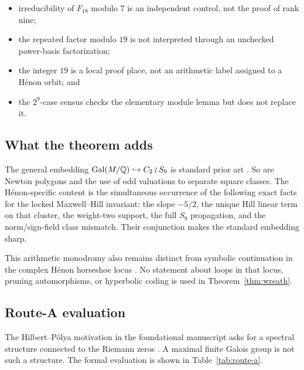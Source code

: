 \begin{itemize}[leftmargin=*,itemsep=2pt]
\item irreducibility of \(F_{18}\) modulo \(7\) is an independent control,
      not the proof of rank nine;
\item the repeated factor modulo \(19\) is not interpreted through an
      unchecked power-basis factorization;
\item the integer \(19\) is a local proof place, not an arithmetic label
      assigned to a H\'enon orbit; and
\item the \(2^9\)-case census checks the elementary module lemma but does
      not replace it.
\end{itemize}

\subsection{What the theorem adds}

The general embedding
\(\operatorname{Gal}(M/\mathbb{Q})\hookrightarrow C_2\mathbin{\wr} S_9\) is standard prior art
\citep{barquero2023wreath}.  So are Newton polygons and the use of odd
valuations to separate square classes.  The H\'enon-specific content is the
simultaneous occurrence of the following exact facts for the locked
Maxwell--Hill invariant: the slope \(-5/2\), the unique Hill linear term on
that cluster, the weight-two support, the full \(S_9\) propagation, and the
norm/sign-field class mismatch.  Their conjunction makes the standard
embedding sharp.

This arithmetic monodromy also remains distinct from symbolic continuation
in the complex H\'enon horseshoe locus \citep{arai2007loops}.  No statement
about loops in that locus, pruning automorphisms, or hyperbolic coding is
used in Theorem~\ref{thm:wreath}.

\subsection{Route-A evaluation}

The Hilbert--P\'olya motivation in the foundational manuscript asks for a
spectral structure connected to the Riemann zeros
\citep{wang2026henonmodel}.  A maximal finite Galois group is not such a
structure.  The formal evaluation is shown in Table~\ref{tab:route-a}.

